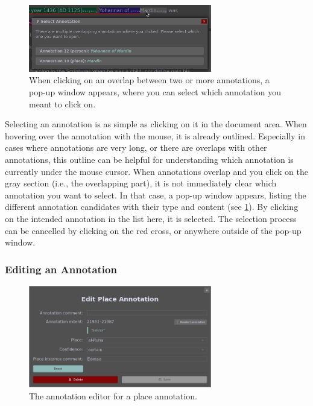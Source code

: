 \begin{figure}[htb]
  \centering
  \includegraphics[width=8cm]{../src/assets/annotator-documentation/select-annotation.png}
  \caption{
    When clicking on an overlap between two or more annotations, a pop-up window appears, where you can select which annotation you meant to click on.
  }
  \label{fig:annotation-selection}
\end{figure}

Selecting an annotation is as simple as clicking on it in the document area.
When hovering over the annotation with the mouse, it is already outlined.
Especially in cases where annotations are very long, or there are overlaps with other annotations, this outline can be helpful for understanding which annotation is currently under the mouse cursor.
When annotations overlap and you click on the gray section (i.e., the overlapping part), it is not immediately clear which annotation you want to select.
In that case, a pop-up window appears, listing the different annotation candidates with their type and content (see \cref{fig:annotation-selection}).
By clicking on the intended annotation in the list here, it is selected.
The selection process can be cancelled by clicking on the red cross, or anywhere outside of the pop-up window.


\subsubsection{Editing an Annotation}
\label{sec:annotation-editing}

\begin{figure}[htb]
  \centering
  \includegraphics[width=8cm]{../src/assets/annotator-documentation/edit-place-annotation.png}

  \caption{
    The annotation editor for a place annotation.
  }
  \label{fig:edit-place-annotation}
\end{figure}

